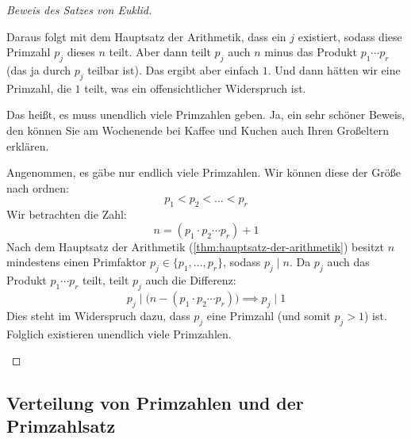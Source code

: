 \begin{proof}[Beweis des Satzes von Euklid]
\begin{spoken-clean}[01:05:53 - 01:07:28]
Daraus folgt mit dem Hauptsatz der Arithmetik, dass ein $j$ existiert, sodass diese Primzahl $p_j$ dieses $n$ teilt. Aber dann teilt $p_j$ auch $n$ minus das Produkt $p_1 \cdots p_r$ (das ja durch $p_j$ teilbar ist). Das ergibt aber einfach $1$. Und dann hätten wir eine Primzahl, die $1$ teilt, was ein offensichtlicher Widerspruch ist.

Das heißt, es muss unendlich viele Primzahlen geben. Ja, ein sehr schöner Beweis, den können Sie am Wochenende bei Kaffee und Kuchen auch Ihren Großeltern erklären.
\end{spoken-clean}

\begin{math-stroke}
Angenommen, es gäbe nur endlich viele Primzahlen. Wir können diese der Größe nach ordnen:
\[ p_1 < p_2 < \dots < p_r \]
Wir betrachten die Zahl:
\begin{equation}\label{eq:euklid-zahl}
n = (p_1 \cdot p_2 \cdots p_r) + 1
\end{equation}
Nach dem Hauptsatz der Arithmetik (\cref{thm:hauptsatz-der-arithmetik}) besitzt $n$ mindestens einen Primfaktor $p_j \in \{p_1, \dots, p_r\}$, sodass $p_j \mid n$.
Da $p_j$ auch das Produkt $p_1 \cdots p_r$ teilt, teilt $p_j$ auch die Differenz:
\[ p_j \mid \bigl( n - (p_1 \cdot p_2 \cdots p_r) \bigr) \implies p_j \mid 1 \]
Dies steht im Widerspruch dazu, dass $p_j$ eine Primzahl (und somit $p_j > 1$) ist. Folglich existieren unendlich viele Primzahlen.
\end{math-stroke}
\end{proof}

\subsection{Verteilung von Primzahlen und der Primzahlsatz}

